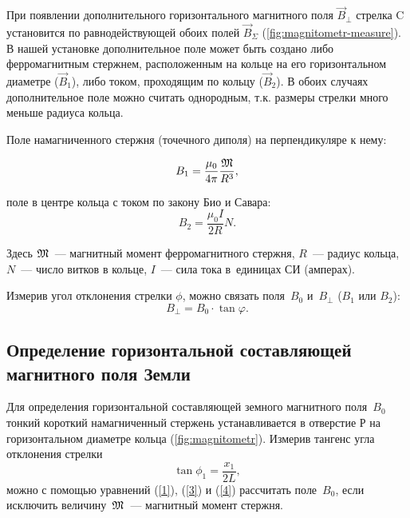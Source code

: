 
При появлении дополнительного горизонтального магнитного поля $\vec{B}_{\perp}$ стрелка C установится по равнодействующей
обоих полей $\vec{B}_{\Sigma}$ (\ref{fig:magnitometr-measure}). В нашей установке дополнительное поле может быть создано либо ферромагнитным
стержнем, расположенным на кольце на его горизонтальном диаметре ($\vec{B}_1$), либо током, проходящим по кольцу
($\vec{B}_2$). В обоих случаях дополнительное поле можно считать однородным, т.к. размеры стрелки много меньше радиуса
кольца.

Поле намагниченного стержня (точечного диполя) на перпендикуляре к нему:

\begin{equation}
	B_1=\frac{\mu_0}{4\pi}\frac{\mathfrak M}{R^3},
\end{equation}

поле в центре кольца с током по закону Био и Савара:
\begin{equation}
	B_2=\frac{\mu_0 I}{2R}N.
\end{equation}

Здесь $\mathfrak M$~--- магнитный момент ферромагнитного стержня, $R$~--- радиус кольца, $N$~--- число витков в кольце,
$I$~--- сила тока в~единицах СИ (амперах).

Измерив угол отклонения стрелки $\phi$, можно связать поля~$B_0$ и~$B_{\perp}$ ($B_1$ или $B_2$):
\begin{equation}
	B_{\perp}=B_0\cdot \tan{\varphi}.
\end{equation}

\subsection*{Определение горизонтальной составляющей магнитного поля Земли}

Для определения горизонтальной составляющей земного магнитного поля~$B_0$ тонкий короткий намагниченный стержень
устанавливается в отверстие Р на горизонтальном диаметре кольца (\ref{fig:magnitometr}). Измерив тангенс угла отклонения стрелки
\begin{equation}
	\tan\phi_1=\frac{x_1}{2L},
\end{equation}
можно с помощью уравнений (\eqref{1}), (\eqref{3}) и (\eqref{4}) рассчитать поле~$B_0$, если исключить величину~$\mathfrak M$~--- магнитный
момент стержня.

